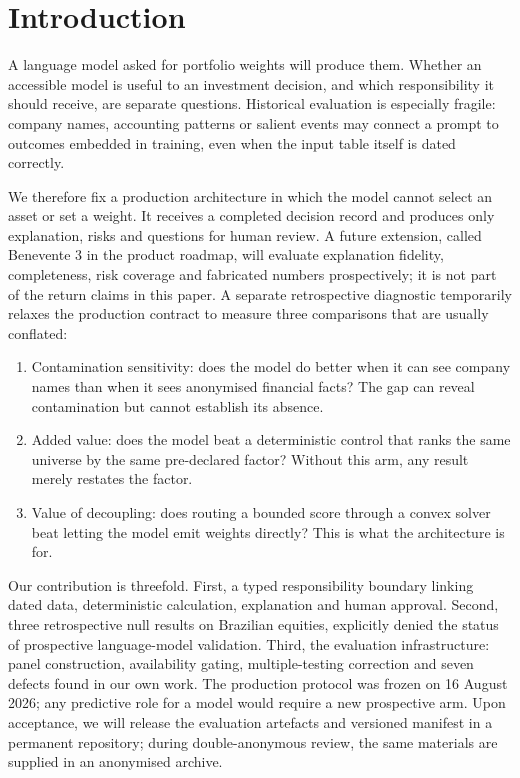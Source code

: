 \documentclass[10pt,conference]{IEEEtran}
\begin{document}
\section{Introduction}

A language model asked for portfolio weights will produce them. Whether an accessible model is useful to an investment decision, and which responsibility it should receive, are separate questions. Historical evaluation is especially fragile: company names, accounting patterns or salient events may connect a prompt to outcomes embedded in training, even when the input table itself is dated correctly.

We therefore fix a production architecture in which the model cannot select an asset or set a weight. It receives a completed decision record and produces only explanation, risks and questions for human review. A future extension, called Benevente 3 in the product roadmap, will evaluate explanation fidelity, completeness, risk coverage and fabricated numbers prospectively; it is not part of the return claims in this paper. A separate retrospective diagnostic temporarily relaxes the production contract to measure three comparisons that are usually conflated:

\begin{enumerate}
\item Contamination sensitivity: does the model do better when it can see company names than when it sees anonymised financial facts? The gap can reveal contamination but cannot establish its absence.
\item Added value: does the model beat a deterministic control that ranks the same universe by the same pre-declared factor? Without this arm, any result merely restates the factor.
\item Value of decoupling: does routing a bounded score through a convex solver beat letting the model emit weights directly? This is what the architecture is for.
\end{enumerate}

Our contribution is threefold. First, a typed responsibility boundary linking dated data, deterministic calculation, explanation and human approval. Second, three retrospective null results on Brazilian equities, explicitly denied the status of prospective language-model validation. Third, the evaluation infrastructure: panel construction, availability gating, multiple-testing correction and seven defects found in our own work. The production protocol was frozen on 16 August 2026; any predictive role for a model would require a new prospective arm. Upon acceptance, we will release the evaluation artefacts and versioned manifest in a permanent repository; during double-anonymous review, the same materials are supplied in an anonymised archive.
\end{document}
